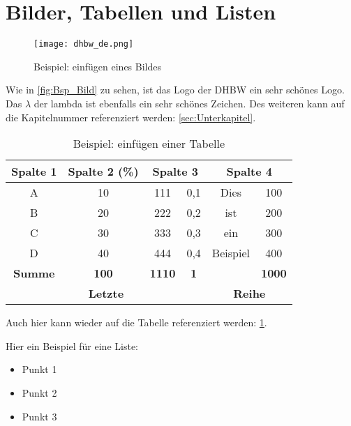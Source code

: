 
\newpage
\section{Bilder, Tabellen und Listen}


\begin{figure}[h]
    \centering
    \texttt{[image: dhbw\_de.png]}
    \caption{Beispiel: einfügen eines Bildes \cite{Mustermann2023}}
    \label{fig:Bsp_Bild}
\end{figure}

Wie in \autoref{fig:Bsp_Bild} zu sehen, ist das Logo der \ac{DHBW} ein sehr schönes Logo. Das $\lambda$ der \ac{lambda} ist ebenfalls ein sehr schönes Zeichen. Des weiteren kann auf die Kapitelnummer referenziert werden: \autoref{sec:Unterkapitel}.


\vspace{0.5cm}
\begin{table}[h]
    \centering
    \begin{tabular}[c]{|c|c|c|c|c|c|}
        \hline
            \textbf{Spalte 1} & 
            \textbf{Spalte 2 (\%)} &  
            \multicolumn{2}{|c|}{\textbf{Spalte 3}} & 
            \multicolumn{2}{|c|}{\textbf{Spalte 4}}\\
        \hline
            A &     10 &    111 &   0,1 &   Dies &      100 \\
        \hline
            B &     20 &    222 &   0,2 &   ist &       200 \\
        \hline
            C &     30 &    333 &   0,3 &   ein &       300 \\
        \hline
            D &     40 &    444 &   0,4 &   Beispiel &  400 \\
        \hline
            \textbf{Summe} &
            \textbf{100} &
            \textbf{1110} &
            \textbf{1} &  &
            \textbf{1000}\\
        \hline
            \multicolumn{4}{|c|}{\textbf{Letzte}} & 
            \multicolumn{2}{|c|}{\textbf{Reihe}} \\
        \hline
    \end{tabular}
    \caption{Beispiel: einfügen einer Tabelle}
    \label{tab:Bsp_Tabelle}
\end{table}

Auch hier kann wieder auf die Tabelle referenziert werden: \ref{tab:Bsp_Tabelle}.


\vspace{0.5cm}
Hier ein Beispiel für eine Liste:
\begin{itemize}[label=\textbullet]
    \item Punkt 1
    \item Punkt 2
    \item Punkt 3
\end{itemize}